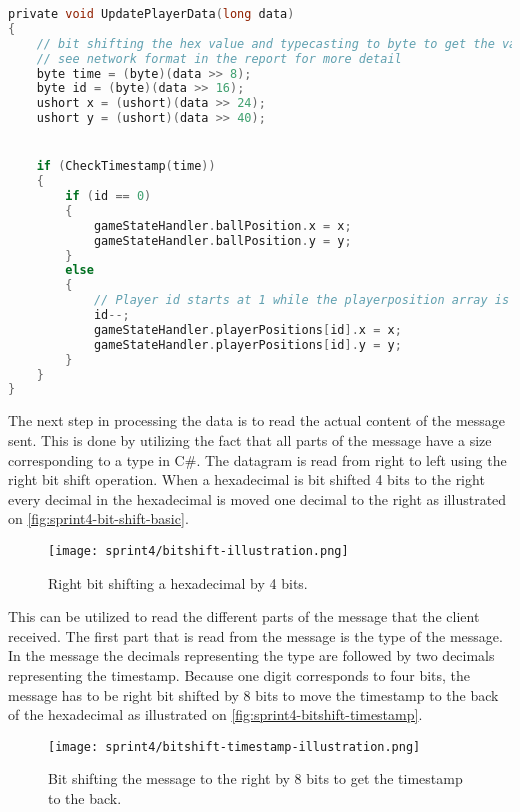\begin{lstlisting}[caption={Updating player data in UDP client}, captionpos=b,language=C,label={lst:updateplayerdata}]
private void UpdatePlayerData(long data)
{
    // bit shifting the hex value and typecasting to byte to get the values.
    // see network format in the report for more detail
    byte time = (byte)(data >> 8);
    byte id = (byte)(data >> 16);
    ushort x = (ushort)(data >> 24);
    ushort y = (ushort)(data >> 40);


    if (CheckTimestamp(time))
    {
        if (id == 0)
        {
            gameStateHandler.ballPosition.x = x;
            gameStateHandler.ballPosition.y = y;
        }
        else
        {
            // Player id starts at 1 while the playerposition array is 0 indexed. Decrementing id so that they line up.
            id--;
            gameStateHandler.playerPositions[id].x = x;
            gameStateHandler.playerPositions[id].y = y;
        }
    }
}
\end{lstlisting}
\noindent
The next step in processing the data is to read the actual content of the message sent.
This is done by utilizing the fact that all parts of the message have a size corresponding to a type in C\#.
The datagram is read from right to left using the right bit shift operation.
When a hexadecimal is bit shifted 4 bits to the right every decimal in the hexadecimal is moved one decimal to the right as illustrated on \autoref{fig:sprint4-bit-shift-basic}.
\begin{figure}[H]
    \centering
    \texttt{[image: sprint4/bitshift-illustration.png]}
    \caption{Right bit shifting a hexadecimal by 4 bits.}
    \label{fig:sprint4-bit-shift-basic}
\end{figure}
\noindent
This can be utilized to read the different parts of the message that the client received.
The first part that is read from the message is the type of the message.
In the message the decimals representing the type are followed by two decimals representing the timestamp.
Because one digit corresponds to four bits, the message has to be right bit shifted by 8 bits to move the timestamp to the back of the hexadecimal as illustrated on \autoref{fig:sprint4-bitshift-timestamp}.
\begin{figure}[H]
    \centering
    \texttt{[image: sprint4/bitshift-timestamp-illustration.png]}
    \caption{Bit shifting the message to the right by 8 bits to get the timestamp to the back.}
    \label{fig:sprint4-bitshift-timestamp}
\end{figure}
